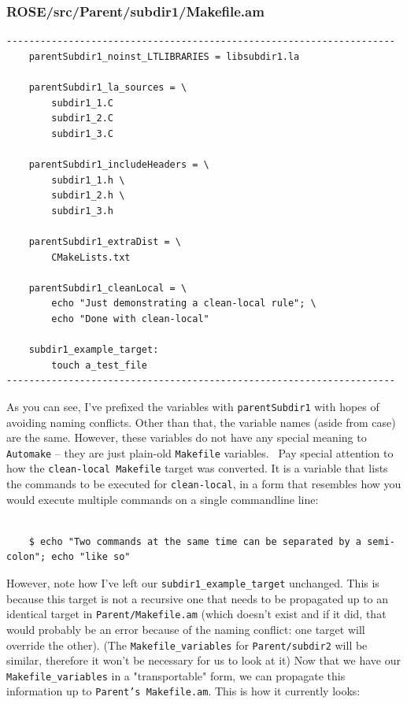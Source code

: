 \subsubsection{ROSE/src/Parent/subdir1/Makefile.am}
    \begin{verbatim}
---------------------------------------------------------------------
    parentSubdir1_noinst_LTLIBRARIES = libsubdir1.la

    parentSubdir1_la_sources = \
        subdir1_1.C
        subdir1_2.C
        subdir1_3.C 

    parentSubdir1_includeHeaders = \
        subdir1_1.h \
        subdir1_2.h \
        subdir1_3.h

    parentSubdir1_extraDist = \
        CMakeLists.txt

    parentSubdir1_cleanLocal = \
        echo "Just demonstrating a clean-local rule"; \
        echo "Done with clean-local"

    subdir1_example_target:
        touch a_test_file
---------------------------------------------------------------------
    \end{verbatim}
As you can see, I've prefixed the variables with \texttt{parentSubdir1} with hopes of avoiding
naming conflicts. Other than that, the variable names (aside from case) are the same. However,
these variables do not have any special meaning to \texttt{Automake} -- they are just plain-old
\texttt{Makefile} variables.
\newline\newline\
Pay special attention to how the \texttt{clean-local Makefile} target was converted. It is
a variable that lists the commands to be executed for \texttt{clean-local}, in a form that
resembles how you would execute multiple commands on a single commandline line:

    \begin{verbatim}

    $ echo "Two commands at the same time can be separated by a semi-colon"; echo "like so"
    \end{verbatim}
However, note how I've left our \texttt{subdir1\_example\_target} unchanged. This is because
this target is not a recursive one that needs to be propagated up to an identical target in
\texttt{Parent/Makefile.am} (which doesn't exist and if it did, that would probably be an
error because of the naming conflict: one target will override the other).
(The \texttt{Makefile\_variables} for \texttt{Parent/subdir2} will be similar, therefore
it won't be necessary for us to look at it)
\newline\newline
Now that we have our \texttt{Makefile\_variables} in a "transportable" form, we can
propagate this information up to \texttt{Parent's Makefile.am}. This is how it currently
looks:

